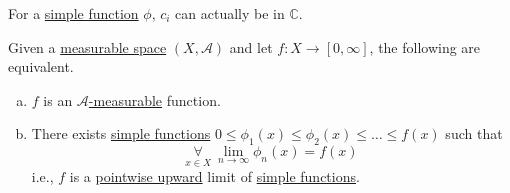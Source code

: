 \begin{prev}
	For a \hyperref[def:simple-function]{simple function} \(\phi\), \(c_{i}\) can actually be in \(\mathbb{C} \).
\end{prev}

\begin{theorem}\label{thm:lec11}
	Given a \hyperref[def:measurable-space]{measurable space} \((X, \mathcal{A} )\) and let \(f\colon X\to [0, \infty ]\), the following are equivalent.
	\begin{enumerate}[(a)]
		\item\label{thm:lec11-a} \(f\) is an \hyperref[def:A-measurable-function]{\(\mathcal{A} \)-measurable} function.
		\item\label{thm:lec11-b} There exists \hyperref[def:simple-function]{simple functions} \(0\leq \phi_1(x)\leq \phi_2(x)\leq \dots \leq f(x) \) such that
		      \[
			      \underset{x\in X}{\forall }\ \lim_{n \to \infty} \phi _{n}(x) = f(x)
		      \]
		      i.e., \(f\) is a \underline{\hyperref[def:pointwise-convergence]{pointwise} upward} limit of \hyperref[def:simple-function]{simple functions}.
	\end{enumerate}
\end{theorem}
